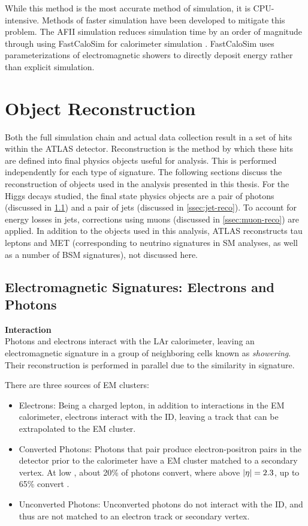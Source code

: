 While this method is the most accurate method of simulation, it is CPU-intensive. Methods of faster simulation have been developed to mitigate this problem. The \gls{AFII} simulation reduces simulation time by an order of magnitude through using FastCaloSim for calorimeter simulation \cite{fastcalosim}. FastCaloSim uses parameterizations of electromagnetic showers to directly deposit energy rather than explicit simulation.


\section{Object Reconstruction} \label{sec:reconstruction}

Both the full simulation chain and actual data collection result in a set of hits within the ATLAS detector. Reconstruction is the method by which these hits are defined into final physics objects useful for analysis. This is performed independently for each type of signature. The following sections discuss the reconstruction of objects used in the analysis presented in this thesis. For the Higgs decays studied, the final state physics objects are a pair of photons (discussed in \ref{ssec:em-signatures}) and a pair of jets (discussed in \ref{ssec:jet-reco}). To account for energy losses in jets, corrections using muons (discussed in \ref{ssec:muon-reco}) are applied. In addition to the objects used in this analysis, ATLAS reconstructs tau leptons and \gls{MET} (corresponding to neutrino signatures in \gls{SM} analyses, as well as a number of \gls{BSM} signatures), not discussed here.

\subsection{Electromagnetic Signatures: Electrons and Photons} \label{ssec:em-signatures} %

\noindent\textbf{Interaction}\\
\indent Photons and electrons interact with the \gls{LAr} calorimeter, leaving an electromagnetic signature in a group of neighboring cells known as \textit{showering}. Their reconstruction is performed in parallel due to the similarity in signature.

There are three sources of \gls{EM} clusters:
\begin{itemize}
    \item Electrons: Being a charged lepton, in addition to interactions in the \gls{EM} calorimeter, electrons interact with the \gls{ID}, leaving a track that can be extrapolated to the \gls{EM} cluster.
    \item Converted Photons: Photons that pair produce electron-positron pairs in the detector prior to the calorimeter have a \gls{EM} cluster matched to a secondary vertex. At low \abseta, about 20\% of photons convert, where above $|\eta|=2.3$, up to 65\% convert \cite{photon-electron-perf}.
    \item Unconverted Photons: Unconverted photons do not interact with the \gls{ID}, and thus are not matched to an electron track or secondary vertex.
\end{itemize}

